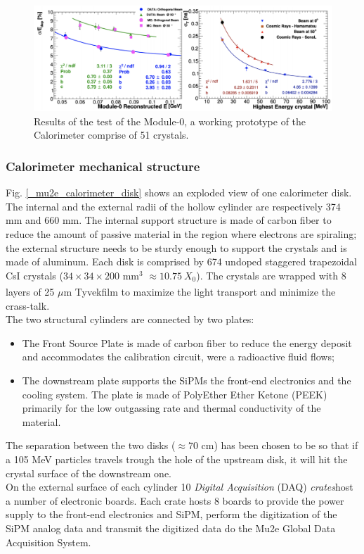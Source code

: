 \documentclass[12pt,a4paper,openright, oneside, titlepage]{book} %
\begin{document}
\begin{figure}[h!]
\centering
\includegraphics[scale=0.5]{calorimeter_test}
\caption[Calorimeter prototype results]{Results of the test of the Module-0, a working prototype of the Calorimeter comprise of 51 crystals. \cite{Donghia:2019} \cite{Calorimeter:2020}}
\label{_calorimeter_test}
\end{figure}


\subsubsection{Calorimeter mechanical structure}
Fig. \ref{_mu2e_calorimeter_disk} shows an exploded view of one calorimeter disk.
The internal and the external radii of the hollow cylinder are respectively 374 mm and 660 mm.
The internal support structure is made of carbon fiber to reduce the amount of passive material in the region where electrons are spiraling; the external structure needs to be sturdy enough to support the crystals and is made of aluminum. 
Each disk is comprised by 674 undoped staggered trapezoidal CsI crystals ($34\times34\times200$ mm$^3$  $\approx10.75\ X_0$). The crystals are wrapped with 8 layers of 25 $\mu$m Tyvek\textsuperscript \textregistered film to maximize the light transport and minimize the crass-talk. \\
The two structural cylinders are connected by two plates:
\begin{itemize}
\item The Front Source Plate is made of carbon fiber to reduce the energy deposit and accommodates the calibration circuit, were a radioactive fluid flows;
\item The downstream plate supports the SiPMs the front-end electronics and the cooling system. 
The plate is made of PolyEther Ether Ketone (PEEK) primarily for the low outgassing rate and thermal conductivity of the material.
\end{itemize} 
The separation between the two disks ($\approx 70$ cm) has been chosen to be so that if a 105 MeV particles travels trough the hole of the upstream disk, it will hit the crystal surface of the downstream one.\\
On the external surface of each cylinder 10 \textit{Digital Acquisition }(DAQ) \textit{crates}host a number of electronic boards.
Each crate hosts 8 boards to provide the power supply to the front-end electronics and SiPM, perform the digitization of the SiPM analog data and transmit the digitized data do the Mu2e Global Data Acquisition System.
\end{document}
